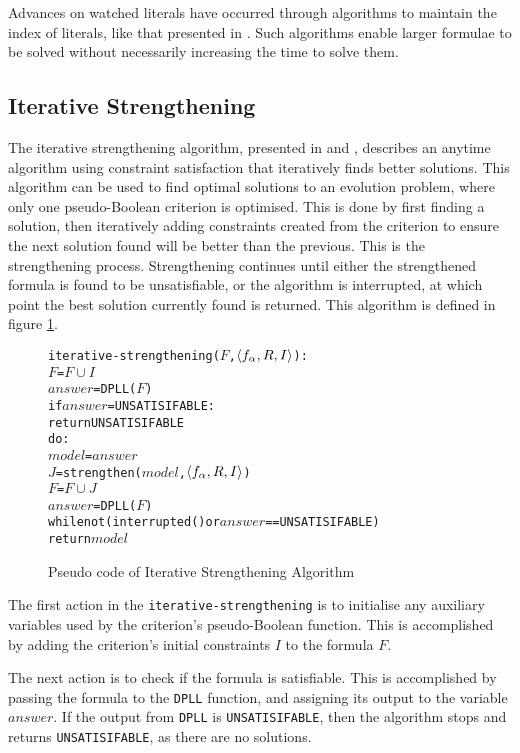 Advances on watched literals have occurred through algorithms to maintain the index of literals, like that presented in \citep{Moskewicz2001}.
Such algorithms enable larger formulae to be solved without necessarily increasing the time to solve them.

\subsection{Iterative Strengthening}
The iterative strengthening algorithm, presented in \citep{calistri1994iterative} and \citep{le2010sat4j}, 
describes an anytime algorithm using constraint satisfaction that iteratively finds better solutions.
This algorithm can be used to find optimal solutions to an evolution problem, where only one pseudo-Boolean criterion is optimised.
This is done by first finding a solution, then iteratively adding constraints created from the criterion to ensure the next solution found will be better than the previous.
This is the strengthening process.
Strengthening continues until either the strengthened formula is found to be unsatisfiable, or the algorithm is interrupted, at which point the best solution currently found is returned. 
This algorithm is defined in figure \ref{impl.strength}.

\begin{figure}[htp]
\begin{center}
\begin{alltt}
iterative-strengthening(\(F\),\(\langle f\sb{\alpha}, R, I \rangle\)):
    \(F\) = \(F \cup I\)
    \(answer\) = DPLL(\(F\))
    if \(answer\) = UNSATISIFABLE:
        return UNSATISIFABLE
    do:
        \(model\) = \(answer\)
        \(J\) = strengthen(\(model\),\(\langle f\sb{\alpha}, R, I \rangle\))
        \(F\) = \(F \cup J\)
        \(answer\) = DPLL(\(F\))
    while not (interrupted() or  \(answer\) == UNSATISIFABLE)
    return \(model\) 
\end{alltt}
  \caption{Pseudo code of Iterative Strengthening Algorithm}
  \label{impl.strength}
\end{center}
\end{figure}

The first action in the \texttt{iterative-strengthening} is to initialise any auxiliary variables used by the criterion's pseudo-Boolean function.
This is accomplished by adding the criterion's initial constraints $I$ to the formula $F$.

The next action is to check if the formula is satisfiable.
This is accomplished by passing the formula to the \verb+DPLL+ function, and assigning its output to the variable $answer$.
If the output from \texttt{DPLL} is \texttt{UNSATISIFABLE}, then the algorithm stops and returns \texttt{UNSATISIFABLE}, as there are no solutions.


